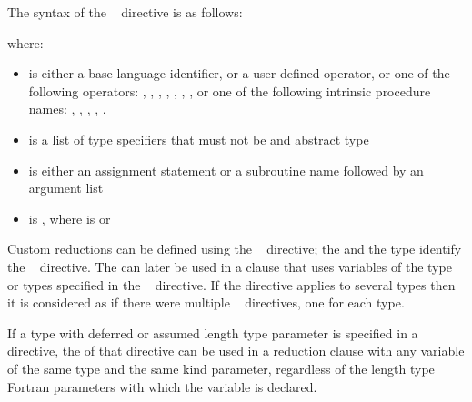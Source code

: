 \begin{fortranspecific}
The syntax of the ~ directive is as follows:


where:

\begin{itemize}
\item {} is either a base language identifier, or a 
      user-defined operator, or one of the following operators: \code{+}, \code{-},
      \code{*}, , , , , or one of 
      the following intrinsic procedure names: , , ,
      , .
\item {} is a list of type specifiers that must not be  
      and abstract type
\item {} is either an assignment statement or a subroutine name followed 
      by an argument list
\item {} is \code{)},
      where  is\linebreak
       or \code{(}\code{)}
\end{itemize}
\end{fortranspecific}

\descr
Custom reductions can be defined using the ~ 
directive; the  and the type identify the 
~ directive. The  can 
later be used in a  clause that uses variables of the type or types 
specified in the ~ directive. If the directive 
applies to several types then it is considered as if there were multiple 
~ directives, one for each type.

\begin{fortranspecific}
If a type with deferred or assumed length type parameter is specified in a 
~ directive, the  
of that directive can be used in a reduction clause with any variable of 
the same type and the same kind parameter, regardless of the length type 
Fortran parameters with which the variable is declared.
\end{fortranspecific}

